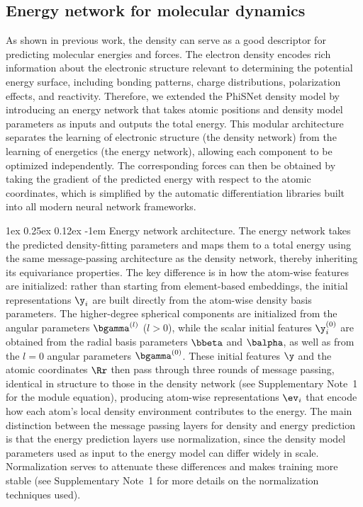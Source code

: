\documentclass[12pt]{article}
\makeatletter
\renewcommand\paragraph{\@startsection{paragraph}{4}{\parindent}%
  {1ex \@plus 0.25ex \@minus 0.12ex}%
  {-1em}%
  {\normalfont\normalsize\itshape}}
\makeatother
\begin{document}
\subsection{Energy network for molecular dynamics}\label{sec:dens_md}

As shown in previous work,\cite{brockherde2017bypassing, bogojeski2020quantum} the density can serve as a good descriptor for predicting molecular energies and forces. The electron density encodes rich information about the electronic structure relevant to determining the potential energy surface, including bonding patterns, charge distributions, polarization effects, and reactivity. Therefore, we extended the PhiSNet density model by introducing an energy network that takes atomic positions and density model parameters as inputs and outputs the total energy. This modular architecture separates the learning of electronic structure (the density network) from the learning of energetics (the energy network), allowing each component to be optimized independently. The corresponding forces can then be obtained by taking the gradient of the predicted energy with respect to the atomic coordinates, which is simplified by the automatic differentiation libraries built into all modern neural network frameworks.

\paragraph{Energy network architecture.}
The energy network takes the predicted density-fitting parameters and maps them to a total energy using the same message-passing architecture as the density network, thereby inheriting its equivariance properties. The key difference is in how the atom-wise features are initialized: rather than starting from element-based embeddings, the initial representations $\y_i$ are built directly from the atom-wise density basis parameters. The higher-degree spherical components are initialized from the angular parameters $\bgamma^{(l)}$ ($l>0$), while the scalar initial features $\y_i^{(0)}$ are obtained from the radial basis parameters $\bbeta$ and $\balpha$, as well as from the $l=0$ angular parameters $\bgamma^{(0)}$.
These initial features $\y$ and the atomic coordinates $\Rr$ then pass through 
three rounds of message passing, identical in structure to those in the density 
network (see Supplementary Note~1 for the module equation), producing atom-wise representations 
$\ev_i$ that encode how each atom's local density environment contributes to the 
energy. The main distinction between the message passing layers for density and energy prediction is that the energy prediction layers use normalization, since the density model parameters used as input to the energy model can differ widely in scale. Normalization serves to attenuate these differences and makes training more stable (see Supplementary Note~1 for more details on the normalization techniques used).
\end{document}

